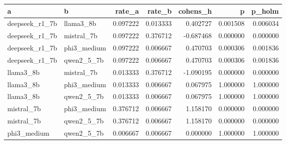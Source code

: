 \begin{tabular}{llrrrrr}
\toprule
a & b & rate\_a & rate\_b & cohens\_h & p & p\_holm \\
\midrule
deepseek\_r1\_7b & llama3\_8b & 0.097222 & 0.013333 & 0.402727 & 0.001508 & 0.006034 \\
deepseek\_r1\_7b & mistral\_7b & 0.097222 & 0.376712 & -0.687468 & 0.000000 & 0.000000 \\
deepseek\_r1\_7b & phi3\_medium & 0.097222 & 0.006667 & 0.470703 & 0.000306 & 0.001836 \\
deepseek\_r1\_7b & qwen2\_5\_7b & 0.097222 & 0.006667 & 0.470703 & 0.000306 & 0.001836 \\
llama3\_8b & mistral\_7b & 0.013333 & 0.376712 & -1.090195 & 0.000000 & 0.000000 \\
llama3\_8b & phi3\_medium & 0.013333 & 0.006667 & 0.067975 & 1.000000 & 1.000000 \\
llama3\_8b & qwen2\_5\_7b & 0.013333 & 0.006667 & 0.067975 & 1.000000 & 1.000000 \\
mistral\_7b & phi3\_medium & 0.376712 & 0.006667 & 1.158170 & 0.000000 & 0.000000 \\
mistral\_7b & qwen2\_5\_7b & 0.376712 & 0.006667 & 1.158170 & 0.000000 & 0.000000 \\
phi3\_medium & qwen2\_5\_7b & 0.006667 & 0.006667 & 0.000000 & 1.000000 & 1.000000 \\
\bottomrule
\end{tabular}
